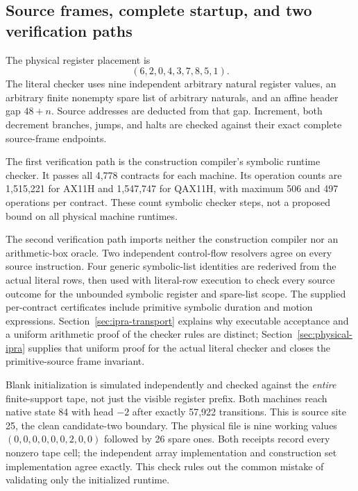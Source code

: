 \documentclass[11pt,a4paper]{article}
\begin{document}
\subsection{Source frames, complete startup, and two verification paths}

The physical register placement is
\[
 (6,2,0,4,3,7,8,5,1).
\]
The literal checker uses nine independent arbitrary natural register
values, an arbitrary finite nonempty spare list of arbitrary naturals,
and an affine header gap $48+n$. Source addresses are deducted from
that gap. Increment, both decrement branches, jumps, and halts are
checked against their exact complete source-frame endpoints.

The first verification path is the construction compiler's symbolic
runtime checker. It passes all 4,778 contracts for each machine.
Its operation counts are 1,515,221 for AX11H and 1,547,747 for QAX11H,
with maximum 506 and 497 operations per contract. These count symbolic
checker steps, not a proposed bound on all physical machine runtimes.

The second verification path imports neither the construction compiler
nor an arithmetic-box oracle. Two independent control-flow resolvers
agree on every source instruction. Four generic symbolic-list identities
are rederived from the actual literal rows, then used with literal-row
execution to check every source outcome for the unbounded symbolic
register and spare-list scope. The supplied per-contract certificates
include primitive symbolic duration and motion expressions.
Section~\ref{sec:ipra-transport} explains why executable acceptance
and a uniform arithmetic proof of the checker rules are distinct;
Section~\ref{sec:physical-ipra} supplies that uniform proof for the
actual literal checker and closes the primitive-source frame invariant.



Blank initialization is simulated independently and checked against
the \emph{entire} finite-support tape, not just the visible register
prefix. Both machines reach native state 84 with head $-2$ after
exactly 57,922 transitions. This is source site 25, the clean
candidate-two boundary. The physical file is nine working values
$(0,0,0,0,0,0,2,0,0)$ followed by 26 spare ones. Both receipts record
every nonzero tape cell; the independent array implementation and
construction set implementation agree exactly. This check rules out
the common mistake of validating only the initialized runtime.
\end{document}
